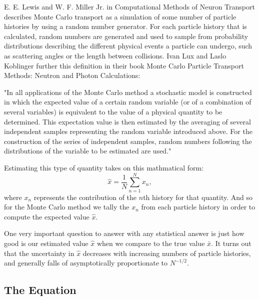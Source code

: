 E. E. Lewis and W. F. Miller Jr. in Computational Methods of Neuron Transport describes Monte Carlo transport as a simulation of some number of particle histories by using a random number generator.
%
For each particle history that is calculated, random numbers are generated and used to sample from probability distributions describing the different physical events a particle can undergo, such as scattering angles or the length between collisions.
%
Ivan Lux and Laslo Koblinger further this definition in their book Monte Carlo Particle Transport Methods: Neutron and Photon Calculations:
%
\begin{displayquote}
"In all applications of the Monte Carlo method a stochastic model is constructed in which the expected value of a certain random variable (or of a combination of several variables) is equivalent to the value of a physical quantity to be determined. This expectation value is then estimated by the averaging of several independent samples representing the random variable introduced above. For the construction of the series of independent samples, random numbers following the distributions of the variable to be estimated are used." ~\cite{LuxMCPTM}
\end{displayquote}

% 
Estimating this type of quantity takes on this mathmatical form:
$$ \hat{x} = \frac{1}{N} \sum_{n=1}^{N} x_{n}, $$
where $x_{n}$ represents the contribution of the $n$th history for that quantity.
%
And so for the Monte Carlo method we tally the $x_{n}$ from each particle history in order to compute the expected value $\hat{x}$. ~\cite{LewisCMNT}
%

%
One very important question to answer with any statistical answer is just how good is our estimated value $\hat{x}$ when we compare to the true value $\bar{x}$.
%
It turns out that the uncertainty in $\hat{x}$ decreases with increasing numbers of particle histories, and generally falls of asymptotically proportionate to $N^{-1/2}$. ~\cite{LewisCMNT}
%

\subsection{ \textbf{ The Equation} }

